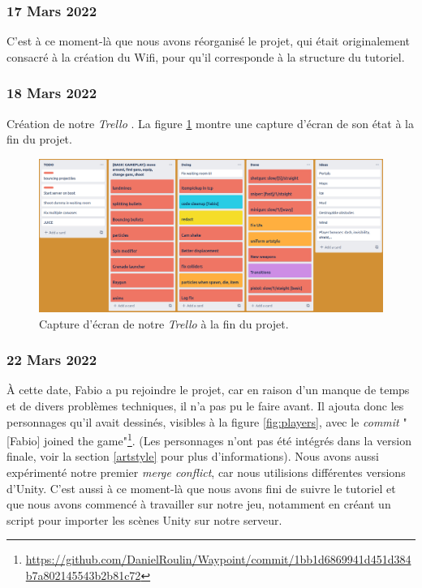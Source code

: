 \documentclass[a4paper]{article}
\begin{document}
\subsubsection{17 Mars 2022}
C'est à ce moment-là que nous avons réorganisé le projet, qui était originalement consacré à la création du Wifi, pour qu'il corresponde à la structure du tutoriel. 

\subsubsection{18 Mars 2022}
Création de notre \textit{Trello} \cite{trello}. La figure \ref{fig:trello} montre une capture d'écran de son état à la fin du projet.
\begin{figure}[h]
    \centering
    \includegraphics[width=\textwidth]{images/trello.png}
    \caption{Capture d'écran de notre \textit{Trello} à la fin du projet.}
    \label{fig:trello}
\end{figure}

\subsubsection{22 Mars 2022}
À cette date, Fabio a pu rejoindre le projet, car en raison d'un manque de temps et de divers problèmes techniques, il n'a pas pu le faire avant. Il ajouta donc les personnages qu'il avait dessinés, visibles à la figure \ref{fig:players},  avec le \textit{commit} "[Fabio] joined the game"\footnote{\url{https://github.com/DanielRoulin/Waypoint/commit/1bb1d6869941d451d384b7a802145543b2b81c72}}. (Les personnages n'ont pas été intégrés dans la version finale, voir la section \ref{artstyle} pour plus d'informations). Nous avons aussi expérimenté notre premier \textit{merge conflict}, car nous utilisions différentes versions d'Unity. C'est aussi à ce moment-là que nous avons fini de suivre le tutoriel et que nous avons commencé à travailler sur notre jeu, notamment en créant un script pour importer les scènes Unity sur notre serveur.
\end{document}
